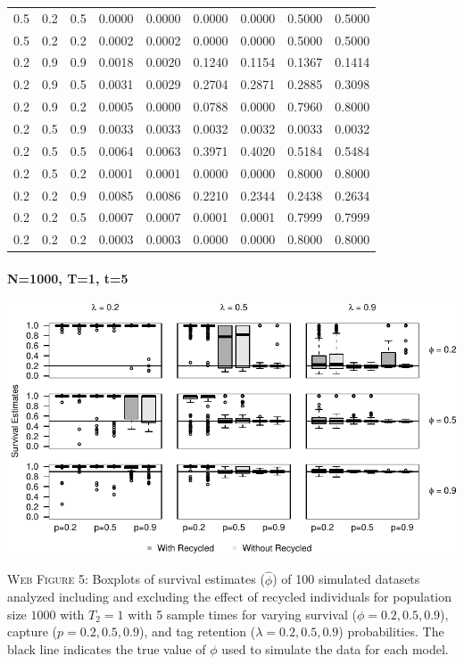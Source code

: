 \documentclass[]{article}
\let\oldparagraph\paragraph
\renewcommand{\paragraph}[1]{\oldparagraph{#1}\mbox{}}
\begin{document}
\begin{table}[ht]
{\begin{tabular}{rrrrrrrrr}
  0.5 & 0.2 & 0.5 & 0.0000 & 0.0000 & 0.0000 & 0.0000 & 0.5000 & 0.5000 \\ 
  0.5 & 0.2 & 0.2 & 0.0002 & 0.0002 & 0.0000 & 0.0000 & 0.5000 & 0.5000 \\ 
  0.2 & 0.9 & 0.9 & 0.0018 & 0.0020 & 0.1240 & 0.1154 & 0.1367 & 0.1414 \\ 
  0.2 & 0.9 & 0.5 & 0.0031 & 0.0029 & 0.2704 & 0.2871 & 0.2885 & 0.3098 \\ 
  0.2 & 0.9 & 0.2 & 0.0005 & 0.0000 & 0.0788 & 0.0000 & 0.7960 & 0.8000 \\ 
  0.2 & 0.5 & 0.9 & 0.0033 & 0.0033 & 0.0032 & 0.0032 & 0.0033 & 0.0032 \\ 
  0.2 & 0.5 & 0.5 & 0.0064 & 0.0063 & 0.3971 & 0.4020 & 0.5184 & 0.5484 \\ 
  0.2 & 0.5 & 0.2 & 0.0001 & 0.0001 & 0.0000 & 0.0000 & 0.8000 & 0.8000 \\ 
  0.2 & 0.2 & 0.9 & 0.0085 & 0.0086 & 0.2210 & 0.2344 & 0.2438 & 0.2634 \\ 
  0.2 & 0.2 & 0.5 & 0.0007 & 0.0007 & 0.0001 & 0.0001 & 0.7999 & 0.7999 \\ 
  0.2 & 0.2 & 0.2 & 0.0003 & 0.0003 & 0.0000 & 0.0000 & 0.8000 & 0.8000 \\ 
   \hline
\end{tabular}
}
\endgroup
\end{table}

\newpage

\paragraph{N=1000, T=1, t=5}\label{n1000-t1-t5}

\includegraphics{Appendix_BW_files/figure-latex/figure5_survival_GJSTL5-1.pdf}

\textsc{Web Figure 5:} Boxplots of survival estimates (\(\hat{\phi}\))
of 100 simulated datasets analyzed including and excluding the effect of
recycled individuals for population size \(1000\) with \(T_2=1\) with 5
sample times for varying survival (\(\phi=0.2,0.5,0.9\)), capture
(\(p=0.2,0.5,0.9\)), and tag retention (\(\lambda=0.2,0.5,0.9\))
probabilities. The black line indicates the true value of \(\phi\) used
to simulate the data for each model.
\end{document}
